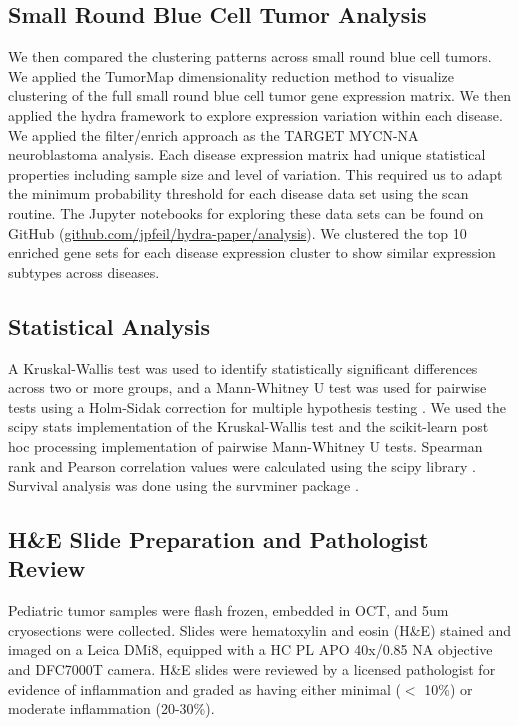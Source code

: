 \documentclass[10pt,letterpaper]{article}
\begin{document}
\subsection{Small Round Blue Cell Tumor Analysis}
We then compared the clustering patterns across small round blue cell tumors. We applied the TumorMap dimensionality reduction method \cite{newtonTumorMapExploringMolecular2017} to visualize clustering of the full small round blue cell tumor gene expression matrix. We then applied the hydra framework to explore expression variation within each disease. We applied the filter/enrich approach as the TARGET MYCN-NA neuroblastoma analysis. Each disease expression matrix had unique statistical properties including sample size and level of variation. This required us to adapt the minimum probability threshold for each disease data set using the scan routine. The Jupyter notebooks for exploring these data sets can be found on GitHub (\url{github.com/jpfeil/hydra-paper/analysis}). We clustered the top 10 enriched gene sets for each disease expression cluster to show similar expression subtypes across diseases. 

\subsection{Statistical Analysis}
A Kruskal-Wallis test was used to identify statistically significant differences across two or more groups, and a Mann-Whitney U test was used for pairwise tests using a Holm-Sidak correction for multiple hypothesis testing \cite{pedregosa2011scikit,jonesSciPyOpenSource2001}. We used the scipy stats implementation of the Kruskal-Wallis test and the scikit-learn post hoc processing implementation of pairwise Mann-Whitney U tests. Spearman rank and Pearson correlation values were calculated using the scipy library \cite{jonesSciPyOpenSource2001}. Survival analysis was done using the survminer package \cite{kassambaraSurvminerDrawingSurvival2019}. 

\subsection{H\&E Slide Preparation and Pathologist Review}
Pediatric tumor samples were flash frozen, embedded in OCT, and 5um cryosections were collected. Slides were hematoxylin and eosin (H\&E) stained and imaged on a Leica DMi8, equipped with a HC PL APO 40x/0.85 NA objective and DFC7000T camera. H\&E slides were reviewed by a licensed pathologist for evidence of inflammation and graded as having either minimal ($<$ 10\%) or moderate inflammation (20-30\%).
\end{document}
